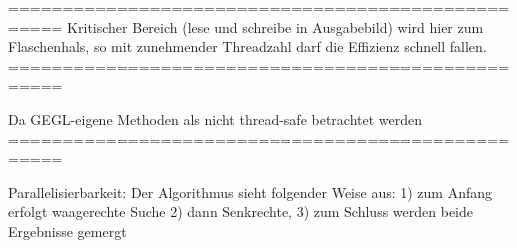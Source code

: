 ===================================================
Kritischer Bereich (lese und schreibe in Ausgabebild) wird hier zum Flaschenhals, so mit zunehmender Threadzahl darf die Effizienz schnell fallen.
===================================================

Da GEGL-eigene Methoden als nicht thread-safe betrachtet werden
===================================================


Parallelisierbarkeit:
Der Algorithmus sieht folgender Weise aus:
	1) zum Anfang erfolgt waagerechte Suche 
	2) dann Senkrechte,
	3) zum Schluss werden beide Ergebnisse gemergt
	




